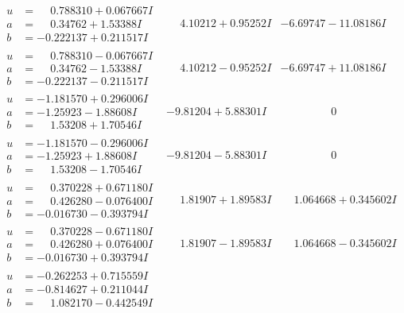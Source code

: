 \documentclass[1p]{elsarticle_modified}
\theoremstyle{definition}
\begin{document}
$$\begin{array}{c|c|c}
\begin{aligned}
u &= \phantom{-}0.788310 + 0.067667 I \\
a &= \phantom{-}0.34762 + 1.53388 I \\
b &= -0.222137 + 0.211517 I\end{aligned}
 & \phantom{-}4.10212 + 0.95252 I & -6.69747 - 11.08186 I \\ \hline\begin{aligned}
u &= \phantom{-}0.788310 - 0.067667 I \\
a &= \phantom{-}0.34762 - 1.53388 I \\
b &= -0.222137 - 0.211517 I\end{aligned}
 & \phantom{-}4.10212 - 0.95252 I & -6.69747 + 11.08186 I \\ \hline\begin{aligned}
u &= -1.181570 + 0.296006 I \\
a &= -1.25923 - 1.88608 I \\
b &= \phantom{-}1.53208 + 1.70546 I\end{aligned}
 & -9.81204 + 5.88301 I & \phantom{-0.000000 } 0 \\ \hline\begin{aligned}
u &= -1.181570 - 0.296006 I \\
a &= -1.25923 + 1.88608 I \\
b &= \phantom{-}1.53208 - 1.70546 I\end{aligned}
 & -9.81204 - 5.88301 I & \phantom{-0.000000 } 0 \\ \hline\begin{aligned}
u &= \phantom{-}0.370228 + 0.671180 I \\
a &= \phantom{-}0.426280 - 0.076400 I \\
b &= -0.016730 - 0.393794 I\end{aligned}
 & \phantom{-}1.81907 + 1.89583 I & \phantom{-}1.064668 + 0.345602 I \\ \hline\begin{aligned}
u &= \phantom{-}0.370228 - 0.671180 I \\
a &= \phantom{-}0.426280 + 0.076400 I \\
b &= -0.016730 + 0.393794 I\end{aligned}
 & \phantom{-}1.81907 - 1.89583 I & \phantom{-}1.064668 - 0.345602 I \\ \hline\begin{aligned}
u &= -0.262253 + 0.715559 I \\
a &= -0.814627 + 0.211044 I \\
b &= \phantom{-}1.082170 - 0.442549 I\end{aligned}

\end{array}$$
\end{document}
